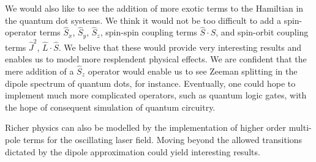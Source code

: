 We would also like to see the addition of more exotic terms to the Hamiltian in the 
quantum dot systems. We think it would not be too difficult to add a spin-operator 
terms $\hat{S}_x$, $\hat{S}_y$, $\hat{S}_z$, spin-spin coupling terms
$\hat{S}\cdot\hat{S}$, and spin-orbit
coupling terms $\hat{J}^2$, $\hat{L}\cdot\hat{S}$. We belive that these would provide 
very interesting results and enables us to model more resplendent physical effects. We are 
confident that the 
mere addition of a $\hat{S}_z$ operator would enable us to see Zeeman splitting in 
the dipole spectrum of quantum dots, for instance. Eventually, one could hope to 
implement much more complicated operators, such as quantum logic gates, with the 
hope of consequent simulation of quantum circuitry.

Richer physics can also be modelled by the implementation of higher order 
multi-pole terms for the oscillating laser field. Moving beyond the allowed transitions
dictated by the dipole approximation could yield interesting results.

